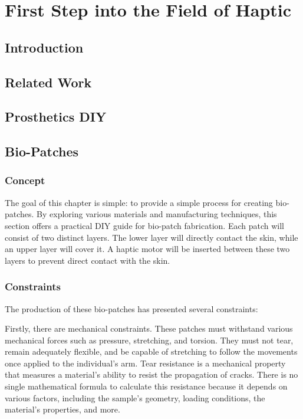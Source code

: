 \chapter{First Step into the Field of Haptic}
\section{Introduction}

\section{Related Work}

\section{Prosthetics DIY}

\section{Bio-Patches}
\subsection{Concept}
The goal of this chapter is simple: to provide a simple process for creating bio-patches. By exploring various materials and manufacturing techniques, this section offers a practical DIY guide for bio-patch fabrication. Each patch will consist of two distinct layers. The lower layer will directly contact the skin, while an upper layer will cover it. A haptic motor will be inserted between these two layers to prevent direct contact with the skin.

\subsection{Constraints}
The production of these bio-patches has presented several constraints:

Firstly, there are mechanical constraints. These patches must withstand various mechanical forces such as pressure, stretching, and torsion. They must not tear, remain adequately flexible, and be capable of stretching to follow the movements once applied to the individual's arm. Tear resistance is a mechanical property that measures a material's ability to resist the propagation of cracks. There is no single mathematical formula to calculate this resistance because it depends on various factors, including the sample's geometry, loading conditions, the material's properties, and more.

